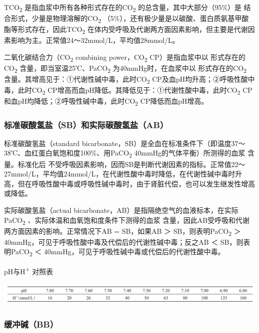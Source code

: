 TCO\textsubscript{2} 是指血浆中所有各种形式存在的CO\textsubscript{2}
的总含量，其中大部分（95\%）是{}
结合形式，少量是物理溶解的CO\textsubscript{2}
（5\%），还有极少量是以碳酸、蛋白质氨基甲酸酯等形式存在，因此TCO\textsubscript{2}
在体内受呼吸及代谢两方面因素影响，但主要是代谢因素影响为主。正常值24～32mmol/L，平均值28mmol/L。

二氧化碳结合力（CO\textsubscript{2} combining power，CO\textsubscript{2}
CP）是指血浆中以{} 形式存在的CO\textsubscript{2}
含量，即当室温25℃、PaCO\textsubscript{2} 为40mmHg时，在血浆中以{}
形式存在的CO\textsubscript{2}
含量。其增高见于：①代谢性碱中毒，此时CO\textsubscript{2}
CP及血pH均升高；②呼吸性酸中毒，此时CO\textsubscript{2}
CP增高而血pH降低。其降低见于：①代谢性酸中毒，此时CO\textsubscript{2}
CP和血pH均降低；②呼吸性碱中毒，此时CO\textsubscript{2}
CP降低而血pH增高。

\subsubsection{标准碳酸氢盐（SB）和实际碳酸氢盐（AB）}

标准碳酸氢盐（standard
bicarbonate，SB）是全血在标准条件下（即温度37～38℃、血红蛋白氧饱和度100\%、用PaCO\textsubscript{2}
40mmHg的气体平衡）所测得的血浆{} 含量。标准化后{}
不受呼吸因素影响，因而SB是判断代谢因素的指标。正常值22～27mmol/L，平均值24mmol/L，在代谢性酸中毒时降低，在代谢性碱中毒时升高，但在呼吸性酸中毒或呼吸性碱中毒时，由于肾脏代偿，也可以发生继发性增高或降低。

实际碳酸氢盐（actual
bicarbonate，AB）是指隔绝空气的血液标本，在实际PaCO\textsubscript{2}
、实际体温和血氧饱和度条件下测得的血浆{}
含量，因此AB受呼吸和代谢两方面因素的影响。正常情况下AB = SB，如果AB ＞
SB，则表明PaCO\textsubscript{2} ＞
40mmHg，可见于呼吸性酸中毒及代偿后的代谢性碱中毒；反之AB ＜
SB，则表明PaCO\textsubscript{2} ＜
40mmHg，可见于呼吸性碱中毒或代偿后的代谢性酸中毒。

\begin{table}[htbp]
\centering
\caption{pH与H\textsuperscript{+} 对照表}
\label{tab68-1}
\includegraphics[width=6.60417in,height=0.44792in]{./images/Image00253.jpg}
\end{table}

\subsubsection{缓冲碱（BB）}

